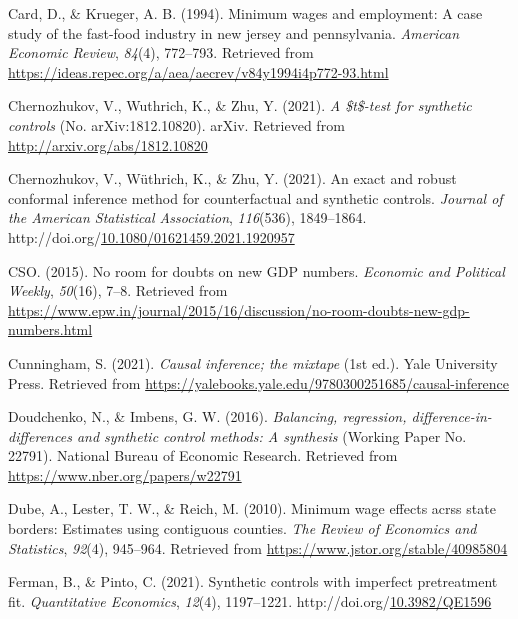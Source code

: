 \documentclass[12pt,nobind, a4paper]{reedthesis}
\newlength{\cslhangindent}
\newenvironment{CSLReferences}[2] %
{%
	\setlength{\parindent}{0pt}
	\ifodd #1 \everypar{\setlength{\hangindent}{\cslhangindent}}\ignorespaces\fi
	\ifnum #2 > 0
	\setlength{\parskip}{#2\baselineskip}
	\fi
}%
{}
\begin{document}
\begin{CSLReferences}{1}{0}
 \leavevmode{}%
 Card, D., \& Krueger, A. B. (1994). Minimum wages and employment: A case study of the fast-food industry in new jersey and pennsylvania. \emph{American Economic Review}, \emph{84}(4), 772--793. Retrieved from \url{https://ideas.repec.org/a/aea/aecrev/v84y1994i4p772-93.html}

 \leavevmode{}%
 Chernozhukov, V., Wuthrich, K., \& Zhu, Y. (2021). \emph{A \$t\$-test for synthetic controls} (No. {arXiv}:1812.10820). {arXiv}. Retrieved from \url{http://arxiv.org/abs/1812.10820}

 \leavevmode{}%
 Chernozhukov, V., Wüthrich, K., \& Zhu, Y. (2021). An exact and robust conformal inference method for counterfactual and synthetic controls. \emph{Journal of the American Statistical Association}, \emph{116}(536), 1849--1864. http://doi.org/\href{https://doi.org/10.1080/01621459.2021.1920957}{10.1080/01621459.2021.1920957}

 \leavevmode{}%
 CSO. (2015). No room for doubts on new {GDP} numbers. \emph{Economic and Political Weekly}, \emph{50}(16), 7--8. Retrieved from \url{https://www.epw.in/journal/2015/16/discussion/no-room-doubts-new-gdp-numbers.html}

 \leavevmode{}%
 Cunningham, S. (2021). \emph{Causal inference; the mixtape} (1st ed.). Yale University Press. Retrieved from \url{https://yalebooks.yale.edu/9780300251685/causal-inference}

 \leavevmode{}%
 Doudchenko, N., \& Imbens, G. W. (2016). \emph{Balancing, regression, difference-in-differences and synthetic control methods: A synthesis} (Working Paper No. 22791). National Bureau of Economic Research. Retrieved from \url{https://www.nber.org/papers/w22791}

 \leavevmode{}%
 Dube, A., Lester, T. W., \& Reich, M. (2010). Minimum wage effects acrss state borders: Estimates using contiguous counties. \emph{The Review of Economics and Statistics}, \emph{92}(4), 945--964. Retrieved from \url{https://www.jstor.org/stable/40985804}

 \leavevmode{}%
 Ferman, B., \& Pinto, C. (2021). Synthetic controls with imperfect pretreatment fit. \emph{Quantitative Economics}, \emph{12}(4), 1197--1221. http://doi.org/\href{https://doi.org/10.3982/QE1596}{10.3982/QE1596}


\end{CSLReferences}
\end{document}
